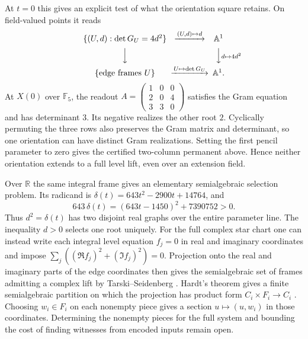 At \(t=0\) this gives an explicit test of what the orientation square
retains. On field-valued points it reads
\[
\begin{CD}
 \{(U,d):\det G_U=4d^2\} @>{(U,d)\mapsto d}>> \mathbb A^1\\
 @VVV @VV{d\mapsto 4d^2}V\\
 \{\text{edge frames }U\} @>{U\mapsto\det G_U}>> \mathbb A^1 .
\end{CD}
\]
At \(X(0)\) over \(\mathbb F_5\), the readout
\(A=\left(\begin{smallmatrix}1&0&0\\2&0&4\\3&3&0\end{smallmatrix}\right)\)
satisfies the Gram equation and has determinant \(3\). Its negative
realizes the other root \(2\).
Cyclically permuting the three rows also preserves the Gram matrix
and determinant, so one orientation can have distinct Gram realizations.
Setting the first pencil parameter to zero gives the certified
two-column permanent above. Hence neither orientation extends to a
full level lift, even over an extension field.

Over \(\mathbb R\) the same integral frame gives an elementary
semialgebraic selection problem. Its radicand is
\(\delta(t)=643t^2-2900t+14764\), and
\[
 643\,\delta(t)=(643t-1450)^2+7390752>0.
\]
Thus \(d^2=\delta(t)\) has two disjoint real graphs over the entire
parameter line. The inequality \(d>0\) selects one root uniquely.
For the full complex star chart one can instead write each integral
level equation \(f_j=0\) in real and imaginary coordinates and impose
\(\sum_j((\Re f_j)^2+(\Im f_j)^2)=0\).
Projection onto the real and imaginary parts of the edge coordinates
then gives the semialgebraic set of frames admitting a complex lift
by Tarski--Seidenberg \cite[Theorem~2.3]{costeSemialgebraic}.
Hardt's theorem gives a finite semialgebraic partition on which the
projection has product form \(C_i\times F_i\to C_i\)
\cite[Theorem~4.1]{costeSemialgebraic}. Choosing \(w_i\in F_i\)
on each nonempty piece gives a section \(u\mapsto(u,w_i)\) in those
coordinates. Determining the nonempty pieces for the full system and
bounding the cost of finding witnesses from encoded inputs remain open.

